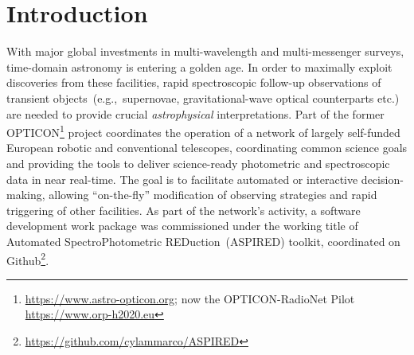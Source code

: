\documentclass[twocolumn, linenumbers]{aastex631}
\begin{document}


\section{Introduction}
With major global investments in multi-wavelength and multi-messenger surveys,
time-domain astronomy is entering a golden age. In order to maximally exploit
discoveries from these facilities, rapid spectroscopic follow-up observations
of transient objects~(e.g.,\ supernovae, gravitational-wave optical counterparts
etc.) are needed to provide crucial {\em astrophysical} interpretations. Part of
the former OPTICON\footnote{\url{https://www.astro-opticon.org}; now the
OPTICON-RadioNet Pilot \url{https://www.orp-h2020.eu}} project coordinates the
operation of a network of largely self-funded European robotic and conventional
telescopes, coordinating common science goals and providing the tools to deliver
science-ready photometric and spectroscopic data in near real-time. The goal is
to facilitate automated or interactive decision-making, allowing ``on-the-fly''
modification of observing strategies and rapid triggering of other facilities.
As part of the network's activity, a software development work package was
commissioned under the working title of Automated SpectroPhotometric
REDuction~(\textsc{ASPIRED}) toolkit, coordinated on
Github\footnote{\url{https://github.com/cylammarco/ASPIRED}}.
\end{document}
